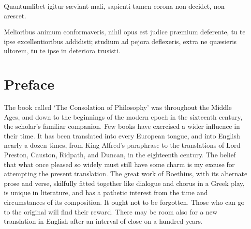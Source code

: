 \documentclass[11pt]{book}
\begin{document}
\vfill

\maketitle

\hspace{0pt}
\vfill

Quantumlibet igitur sæviant mali, sapienti tamen corona non
decidet, non arescet.

Melioribus animum conformaveris, nihil opus est judice præmium      
deferente, tu te ipse excellentioribus addidisti; studium ad pejora     
deflexeris, extra ne quæsieris ultorem, tu te ipse in deteriora        
trusisti.                                                               

\vfill
\pagebreak


\chapter{Preface}

The book called `The Consolation of Philosophy' was \linebreak throughout the
Middle Ages, and down to the beginnings of the modern epoch in the
sixteenth century, the scholar's familiar companion. Few books have
exercised a wider influence in their time. It has been translated into
every European tongue, and into English nearly a dozen times, from King
Alfred's paraphrase to the translations of Lord Preston, Causton,
Ridpath, and Duncan, in the eighteenth century. The belief that what
once pleased so widely must still have some charm is my excuse for
attempting the present translation. The great work of Boethius, with its
alternate prose and verse, skilfully fitted together like dialogue and
chorus in a Greek play, is unique in literature, and has a pathetic
interest from the time and circumstances of its composition. It ought
not to be forgotten. Those who can go to the original will find their
reward. There may be room also for a new translation in English after an
interval of close on a hundred years.
\end{document}
